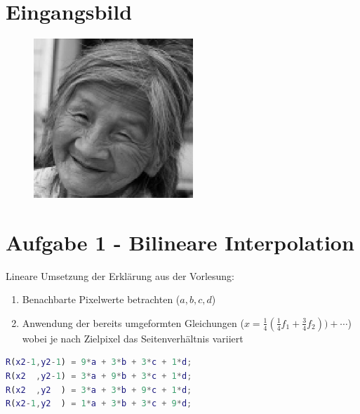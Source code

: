 



\newcommand{\nr}{6}
\lstset{language=matlab}



\section*{Eingangsbild}
\begin{figure}[H]
\begin{center}
\includegraphics[width=60mm]{u07/smalloma.eps}
\end{center}
\end{figure}

\section*{Aufgabe 1 - Bilineare Interpolation}
Lineare Umsetzung der Erkl\"arung aus der Vorlesung:
\begin{enumerate}
\item Benachbarte Pixelwerte betrachten ($a,b,c,d$)
\item Anwendung der bereits umgeformten Gleichungen ($x = \frac{1}{4}(\frac{1}{4}f_1 + \frac{3}{4}f_2)) + \cdots$) 
      wobei je nach Zielpixel das Seitenverh\"altnis variiert
\end{enumerate}

\begin{lstlisting}[language=matlab,caption=Approxiamation der vier neuen Pixel]
R(x2-1,y2-1) = 9*a + 3*b + 3*c + 1*d;
R(x2  ,y2-1) = 3*a + 9*b + 3*c + 1*d;
R(x2  ,y2  ) = 3*a + 3*b + 9*c + 1*d;
R(x2-1,y2  ) = 1*a + 3*b + 3*c + 9*d;
\end{lstlisting}


